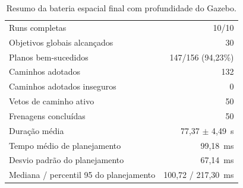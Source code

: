 \begin{table}[htb]
\centering
\caption{Resultados individuais da bateria espacial de referência.}
\label{tab:mono-bateria-individual}
\end{table}

\begin{table}[htb]
\centering
\caption{Resumo da bateria espacial final com profundidade do Gazebo.}
\label{tab:mono-bateria}
\begin{tabular}{lr}
\hline
Runs completas & 10/10 \\
Objetivos globais alcançados & 30 \\
Planos bem-sucedidos & 147/156 (94,23\%) \\
Caminhos adotados & 132 \\
Caminhos adotados inseguros & 0 \\
Vetos de caminho ativo & 50 \\
Frenagens concluídas & 50 \\
Duração média & 77,37 $\pm$ 4,49~s \\
Tempo médio de planejamento & 99,18~ms \\
Desvio padrão do planejamento & 67,14~ms \\
Mediana / percentil 95 do planejamento & 100,72 / 217,30~ms \\
\hline
\end{tabular}
\end{table}

